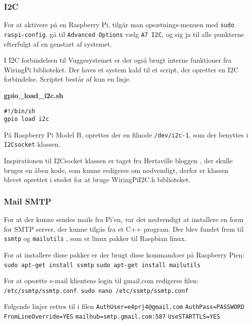 \subsubsection*{I2C}

For at aktivere \iic på en Raspberry Pi, tilgår man opsætnings-menuen med \verb+sudo raspi-config+, gå til \verb+Advanced Options+ vælg \verb+A7 I2C+, og sig ja til alle punkterne efterfulgt af en genstart af systemet.

I I2C forbindelsen til Vuggesystemet er der også brugt interne funktioner fra WiringPi biblioteket. Der laves et system kald til et script, der opretter en I2C forbindelse. Scriptet består af kun en linje.

\textbf{gpio\_load\_i2c.sh}
\begin{lstlisting}
#!/bin/sh
gpio load i2c
\end{lstlisting}

På Raspberry Pi Model B, oprettes der en filnode \verb+/dev/i2c-1+, som der benyttes i \verb+I2Csocket+ klassen.

Inspirationen til I2Csocket klassen er taget fra Hertaville bloggen \citep{website:ic2lib}, der skulle bruges en åben kode, som kunne redigeres om nødvendigt, derfor er klassen blevet oprettet i stedet for at bruge WiringPiI2C.h biblioteket.

\subsubsection*{Mail SMTP}

For at der kunne sendes mails fra Pi'en, var det nødvendigt at installere en form for SMTP server, der kunne tilgås fra et C++ program. Der blev fundet frem til \verb+ssmtp+ og \verb+mailutils+ \citep{website:ssmtpmailutils}, som er linux pakker til Raspbian linux.

For at installere disse pakker er der brugt disse kommandoer på Raspberry Pien: \newline
\verb+sudo apt-get install ssmtp+ \newline
\verb+sudo apt-get install mailutils+

For at opsætte e-mail klientens login til gmail.com redigeres filen: \verb+/etc/ssmtp/ssmtp.conf+. \newline
\verb+sudo nano /etc/ssmtp/ssmtp.conf+

Følgende linjer rettes til i filen\newline
\verb+AuthUser=e4prj4@gmail.com+ \newline
\verb+AuthPass=PASSWORD+ \newline
\verb+FromLineOverride=YES+ \newline
\verb+mailhub=smtp.gmail.com:587+ \newline
\verb+UseSTARTTLS=YES+

